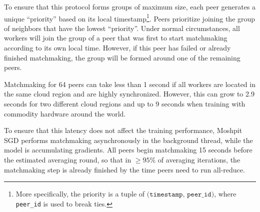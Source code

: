 To ensure that this protocol forms groups of maximum size, each peer generates a unique ``priority'' based on its local timestamp\footnote{More specifically, the priority is a tuple of $\texttt{(timestamp, peer\_id)}$, where \texttt{peer\_id} is used to break ties.}. Peers prioritize joining the group of neighbors that have the lowest ``priority''. Under normal circumstances, all workers will join the group of a peer that was first to start matchmaking according to its own local time. However, if this peer has failed or already finished matchmaking, the group will be formed around one of the remaining peers.

Matchmaking for 64 peers can take less than 1 second if all workers are located in the same cloud region and are highly synchronized. However, this can grow to 2.9 seconds for two different cloud regions and up to 9 seconds when training with commodity hardware around the world.

To ensure that this latency does not affect the training performance, Moshpit SGD performs matchmaking asynchronously in the background thread, while the model is accumulating gradients. All peers begin matchmaking 15 seconds before the estimated averaging round, so that in $\ge 95\%$ of averaging iterations, the matchmaking step is already finished by the time peers need to run all-reduce.